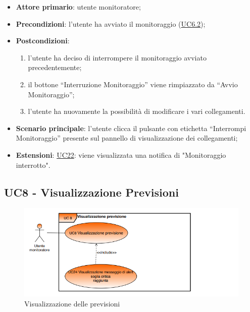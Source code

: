 		\begin{itemize}
			\item\textbf{Attore primario}: utente monitoratore;
			\item\textbf{Precondizioni}: l’utente ha avviato il monitoraggio (\hyperref[par:UC6.2]{UC6.2});
			\item\textbf{Postcondizioni}:
				\begin{enumerate}
					\item l’utente ha deciso di interrompere il monitoraggio avviato precedentemente;
					\item il bottone “Interruzione Monitoraggio” viene rimpiazzato da “Avvio Monitoraggio”;
					\item l’utente ha nuovamente la possibilità di modificare i vari collegamenti.
				\end{enumerate}	
			\item\textbf{Scenario principale}: l’utente clicca il pulsante con etichetta “Interrompi Monitoraggio” presente sul pannello di visualizzazione dei collegamenti;
			\item\textbf{Estensioni}: \hyperref[par:UC22]{UC22}: viene visualizzata una notifica di "Monitoraggio interrotto".		
		\end{itemize}


	\label{par:UC8}
	\subsection{UC8 - Visualizzazione Previsioni}

	\begin{figure}[H]
		\centering
		\includegraphics[scale=0.80]{../Analisi_dei_requisiti/img/Diagrammi_UML/UC8_Visualizzazione_previsioni.png}
		\caption{Visualizzazione delle previsioni}
	\end{figure}

